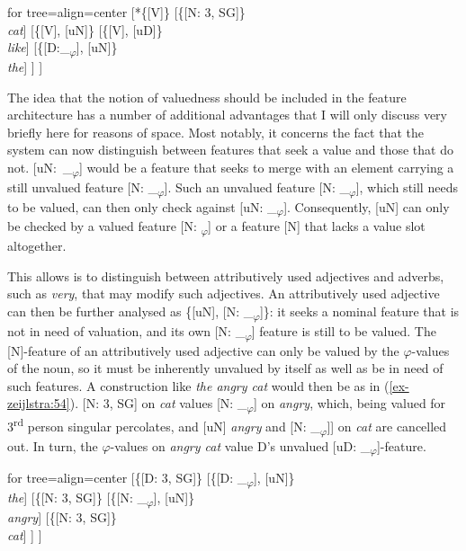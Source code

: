 \documentclass[output=paper
,modfonts
,nonflat]{langsci/langscibook}
\begin{document}
\ea \label{ex-zeijlstra:53}
			\begin{forest}	for tree={align=center}
				[*\{{[}V{]}\}
				[\{{[}N: 3{,} SG{]}\}\\ \textit{cat}]
				[\{{[}V{]}{,} {[}uN{]}\}
				[\{{[}V{]}{,} {[}uD{]}\}\\ \textit{like}]
				[\{{[}D:\_\textsubscript{$\varphi$}{]}{,} {[}uN{]}\}\\ \textit{the}]
				] ] 
		\end{forest}\z

\noindent The idea that the notion of valuedness should be included in the feature architecture has a number of additional advantages that I will only discuss very briefly here for reasons of space. Most notably, it concerns the fact that the system can now distinguish between features that seek a value and those that do not. \mbox{[uN: \_\textsubscript{$\varphi$}]} would be a feature that seeks to merge with an element carrying a still unvalued feature [N: \_\textsubscript{$\varphi$}]. Such an unvalued feature [N: \_\textsubscript{$\varphi$}], which still needs to be valued, can then only check against [uN: \_\textsubscript{$\varphi$}]. Consequently, [uN] can only be checked by a valued feature [N: \textsubscript{$\varphi$}] or a feature [N] that lacks a value slot altogether. 

This allows is to distinguish between attributively used adjectives and adverbs, such as \textit{very}, that may modify such adjectives. An attributively used adjective can then be further analysed as \{[uN], [N: \_\textsubscript{$\varphi$}]\}: it seeks a nominal feature that is not in need of valuation, and its own [N: \_\textsubscript{$\varphi$}] feature is still to be valued. The [N]-feature of an attributively used adjective can only be valued by the $\varphi$-values of the noun, so it must be inherently unvalued by itself as well as be in need of such features. A construction like \textit{the angry cat} would then be as in (\ref{ex-zeijlstra:54}). [N: 3, SG] on \textit{cat} values [N: \_\textsubscript{$\varphi$}] on \textit{angry}, which, being valued for 3\textsuperscript{rd} person singular percolates, and [uN] \textit{angry} and [N: \_\textsubscript{$\varphi$}]] on \textit{cat} are cancelled out. In turn, the $\varphi$-values on \textit{angry cat} value D’s unvalued [uD: \_\textsubscript{$\varphi$}]-feature.


\begin{exe}
\ex\label{ex-zeijlstra:54}
	\begin{forest}	for tree={align=center}
	[\{{[}D: 3{,} SG{]}\}
	[\{{[}D: \_\textsubscript{$\varphi$}{]}{,} {[}uN{]}\}\\ \textit{the}]
	[\{{[}N: 3{,} SG{]}\}
	[\{{[}N: \_\textsubscript{$\varphi$}{]}{,} {[}uN{]}\}\\ \textit{angry}]
	[\{{[}N: 3{,} SG{]}\}\\ \textit{cat}]
	] ]  
	\end{forest}
\end{exe} 
\end{document}
